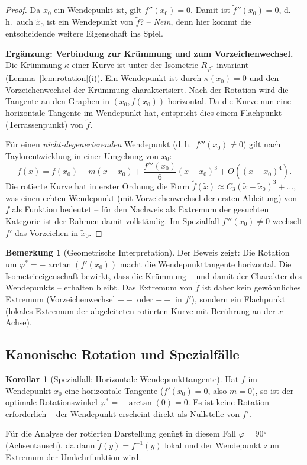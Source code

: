 ﻿\documentclass[12pt, a4paper]{article}
\theoremstyle{definition}
\newtheorem{korollar}{Korollar}[section]
\newtheorem{bemerkung}{Bemerkung}[section]
\begin{document}
\begin{proof}
		Da $x_0$ ein Wendepunkt ist, gilt $f''(x_0) = 0$. Damit ist
		$\tilde{f}''(\tilde{x}_0) = 0$, d.\,h.\ auch $\tilde{x}_0$ ist ein
		Wendepunkt von $\tilde{f}$? -- \emph{Nein}, denn hier kommt die
		entscheidende weitere Eigenschaft ins Spiel.
		
		\medskip
		\noindent\textbf{Ergänzung: Verbindung zur Krümmung und zum Vorzeichenwechsel.}
		Die Krümmung $\kappa$ einer Kurve ist unter der Isometrie $R_{\varphi^*}$
		invariant (Lemma~\ref{lem:rotation}(i)). Ein Wendepunkt ist durch
		$\kappa(x_0) = 0$ und den Vorzeichenwechsel der Krümmung charakterisiert.
		Nach der Rotation wird die Tangente an den Graphen in $(x_0, f(x_0))$
		horizontal. Da die Kurve nun eine horizontale Tangente im Wendepunkt hat,
		entspricht dies einem Flachpunkt (Terrassenpunkt) von $\tilde{f}$.
		
		Für einen \emph{nicht-degenerierenden} Wendepunkt (d.\,h.\ $f'''(x_0) \neq 0$)
		gilt nach Taylorentwicklung in einer Umgebung von $x_0$:
		\[
		f(x) = f(x_0) + m(x-x_0) + \frac{f'''(x_0)}{6}(x-x_0)^3 + O((x-x_0)^4).
		\]
		Die rotierte Kurve hat in erster Ordnung die Form
		$\tilde{f}(\tilde{x}) \approx C_3 (\tilde{x} - \tilde{x}_0)^3 + \ldots$,
		was einen echten Wendepunkt (mit Vorzeichenwechsel der ersten Ableitung)
		von $\tilde{f}$ als Funktion bedeutet -- für den Nachweis als Extremum
		der gesuchten Kategorie ist der Rahmen damit vollständig. Im Spezialfall
		$f'''(x_0) \neq 0$ wechselt $\tilde{f}'$ das Vorzeichen in $\tilde{x}_0$.
	\end{proof}
	
	\begin{bemerkung}[Geometrische Interpretation]
		Der Beweis zeigt: Die Rotation um $\varphi^* = -\arctan(f'(x_0))$ macht
		die Wendepunkttangente horizontal. Die Isometrieeigenschaft bewirkt, dass
		die Krümmung -- und damit der Charakter des Wendepunkts -- erhalten bleibt.
		Das Extremum von $\tilde{f}$ ist daher kein gewöhnliches Extremum (Vorzeichenwechsel
		$+-$ oder $-+$ in $f'$), sondern ein Flachpunkt (lokales Extremum der
		abgeleiteten rotierten Kurve mit Berührung an der $x$-Achse).
	\end{bemerkung}
	
	\subsection{Kanonische Rotation und Spezialfälle}
	
	\begin{korollar}[Spezialfall: Horizontale Wendepunkttangente]\label{kor:horizontal}
		Hat $f$ im Wendepunkt $x_0$ eine horizontale Tangente ($f'(x_0) = 0$, also
		$m = 0$), so ist der optimale Rotationswinkel $\varphi^* = -\arctan(0) = 0$.
		Es ist keine Rotation erforderlich -- der Wendepunkt erscheint direkt als
		Nullstelle von $f'$.
		
		Für die Analyse der rotierten Darstellung genügt in diesem Fall
		$\varphi = 90 °$ (Achsentausch), da dann
		$\tilde{f}(y) = f^{-1}(y)$ lokal und der Wendepunkt zum Extremum
		der Umkehrfunktion wird.
	\end{korollar}
	
\end{document}
